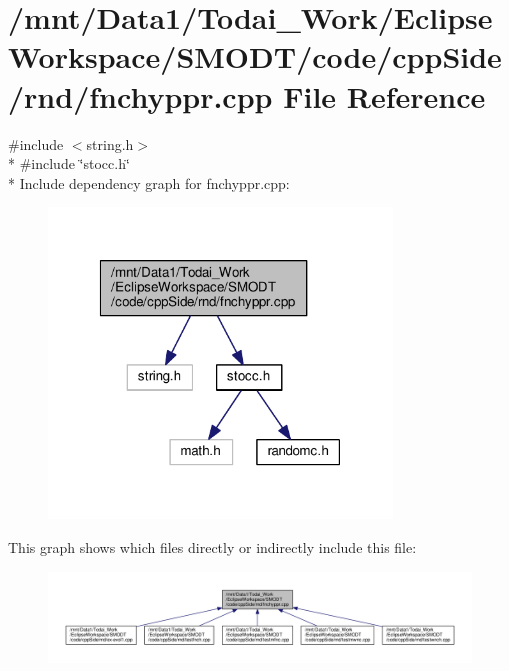 \section{/mnt/\-Data1/\-Todai\-\_\-\-Work/\-Eclipse\-Workspace/\-S\-M\-O\-D\-T/code/cpp\-Side/rnd/fnchyppr.cpp File Reference}
\label{rnd_2fnchyppr_8cpp}
{\ttfamily \#include $<$string.\-h$>$}\\*
{\ttfamily \#include \char`\"{}stocc.\-h\char`\"{}}\\*
Include dependency graph for fnchyppr.\-cpp\-:
\nopagebreak
\begin{figure}[H]
\begin{center}
\leavevmode
\includegraphics[width=259pt]{rnd_2fnchyppr_8cpp__incl}
\end{center}
\end{figure}
This graph shows which files directly or indirectly include this file\-:
\nopagebreak
\begin{figure}[H]
\begin{center}
\leavevmode
\includegraphics[width=350pt]{rnd_2fnchyppr_8cpp__dep__incl}
\end{center}
\end{figure}
